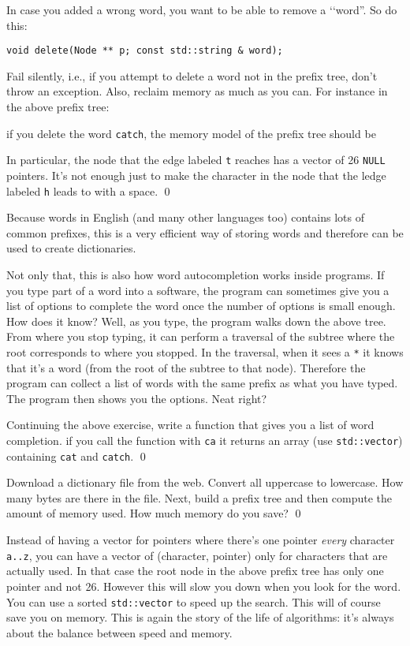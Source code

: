 \begin{ex}
In case you added a wrong word, you want to be able to remove a
\lq\lq word''. So do this:
\begin{Verbatim}[frame=single]
void delete(Node ** p; const std::string & word);
\end{Verbatim}
Fail silently, i.e., if you attempt to delete a word not in the
prefix tree, don't throw an exception.
Also, reclaim memory as much as you can. For instance in the above
prefix tree:

if you delete the word \texttt{catch}, the
memory model of the prefix tree should be

In particular, the node that the edge labeled \texttt{t} reaches
has a vector of 26 \verb!NULL! pointers.
It's not enough just to make the character in the node that the
ledge labeled \texttt{h} leads to with a space.
\qed
\end{ex}

Because words in English (and many other languages too)
contains lots of common prefixes,
this is a very efficient way of storing words
and therefore can be used to create dictionaries.

Not only that, this is also how
word autocompletion works inside programs.
If you type part of a word into a software, the program
can sometimes give you a list of options to complete the word
once the number of options is small enough.
How does it know?
Well, as you type, the program walks down the above
tree.
From where you stop typing,
it can perform a traversal of the subtree where
the root corresponds to where you stopped.
In the traversal, when it sees a \texttt{*}
it knows that it's a word (from the root of the subtree to that node). 
Therefore the program can collect a list of
words with the same prefix as what you have typed.
The program then shows you the options.
Neat right?

\begin{ex}
Continuing the above
exercise,
write a function that
gives you a list of word completion.
if you call the function with \texttt{ca}
it returns an array (use \texttt{std::vector})
containing \texttt{cat} and \texttt{catch}.
\qed
\end{ex}

\begin{ex}
Download a dictionary file from the web.
Convert all uppercase to lowercase.
How many bytes are there in the file.
Next, build a prefix tree and then compute the
amount of memory used.
How much memory do you save?
\qed
\end{ex}

Instead of having a vector for pointers where there's one pointer
\textit{every} character \texttt{a..z},
you can have a vector of (character, pointer)  only for characters that
are actually used.
In that case the root node in the above prefix tree has only
one pointer and not 26.
However this will slow you down when you look for the word.
You can use a sorted \texttt{std::vector} to speed up the search.
This will of course save you on memory.
This is again the story of the life of algorithms:
it's always about the balance between speed and memory.
